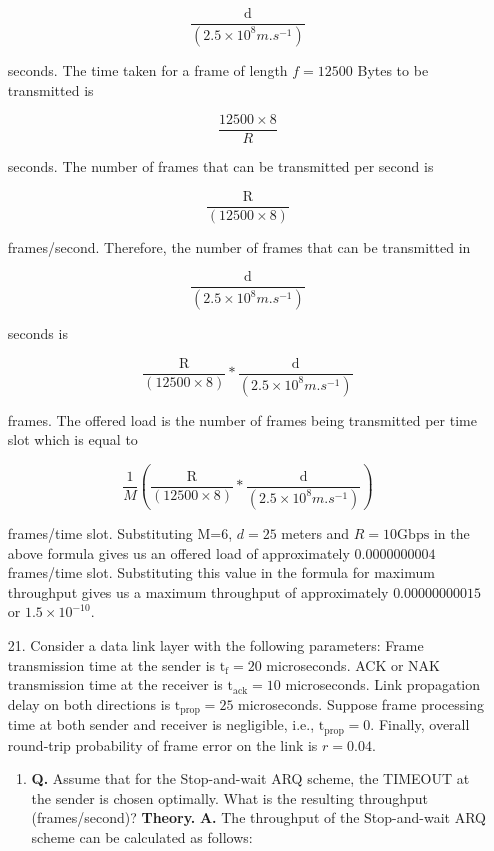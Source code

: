 \documentclass[main.tex]{subfiles}
\begin{document}
\begin{enumerate}
$$
\frac{\mathrm{d}}{(2.5\times 10^{8} \si{m.s^{-1}})}
$$ 

seconds. The time taken for a frame of length $f=12500$ Bytes to be transmitted is 

$$
\frac{12500 \times 8}{R}
$$ 

seconds. The number of frames that can be transmitted per second is 

$$
\frac{\mathrm{R}}{(12500 \times 8)}
$$

frames/second. Therefore, the number of frames that can be transmitted in 

$$
\frac{\mathrm{d}}{(2.5\times 10^{8} \si{m.s^{-1}})}
$$ 

seconds is 

$$
\frac{\mathrm{R}}{(12500 \times 8)} * \frac{\mathrm{d}}{(2.5\times 10^{8} \si{m.s^{-1}})}
$$ 

frames. The offered load is the number of frames being transmitted per time slot which is equal to 

$$
\frac{1}{M}\left(\frac{\mathrm{R}}{(12500 \times 8)} * \frac{\mathrm{d}}{(2.5\times 10^{8} \si{m.s^{-1}})}\right)
$$ 

frames/time slot. Substituting M=6, $d=25$ meters and $R=10 \mathrm{Gbps}$ in the above formula gives us an offered load of approximately $\mathbf{0.0000000004}$ frames/time slot. Substituting this value in the formula for maximum throughput gives us a maximum throughput of approximately $0.00000000015$ or $1.5 \times 10^{-10}$.


\item[21.] Consider a data link layer with the following parameters: Frame transmission time at the sender is $\mathrm{t}_\mathrm{f}=20$ microseconds. ACK or NAK transmission time at the receiver is $\mathrm{t}_\mathrm{ack} = 10$ microseconds. Link propagation delay on both directions is $\mathrm{t}_{\mathrm{prop}} = 25$ microseconds. Suppose frame processing time at both sender and receiver is negligible, i.e., $\mathrm{t}_\mathrm{prop} = 0$. Finally, overall round-trip probability of frame error on the link is $r=0.04$. 

    \begin{enumerate}
        \item \textbf{Q.} Assume that for the Stop-and-wait ARQ scheme, the TIMEOUT at the sender is chosen optimally. What is the resulting throughput (frames/second)? \textbf{Theory.}  \textbf{A.} The throughput of the Stop-and-wait ARQ scheme can be calculated as follows:
        

\end{enumerate}
\end{enumerate}
\end{document}
